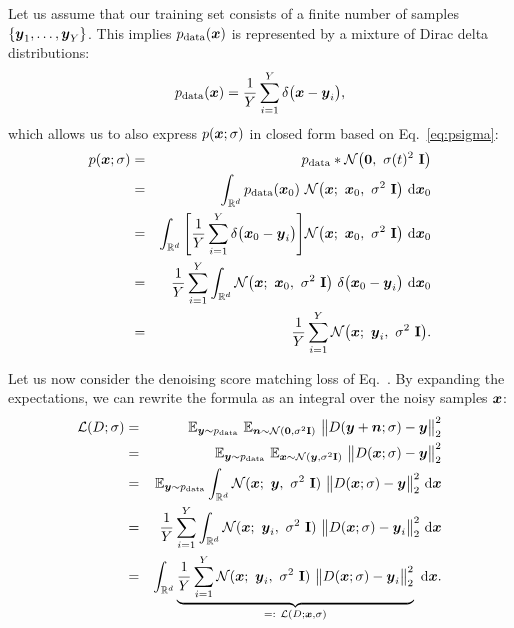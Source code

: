 Let us assume that our training set consists of a finite number of samples $\{\boldsymbol{y}_1, \dots, \boldsymbol{y}_Y\}$.
This implies $p_\text{data}(\boldsymbol{x})$ is represented by a mixture of Dirac delta distributions:
\begin{equation}
  p_\text{data}(\boldsymbol{x}) = \frac{1}{Y} \sum_{i=1}^Y \delta \big( \boldsymbol{x} - \boldsymbol{y}_i \big)
  \text{,}
\end{equation}
which allows us to also express $p(\boldsymbol{x}; \sigma)$ in closed form based on Eq.~\ref{eq:psigma}:
\begin{eqnarray}
  p(\boldsymbol{x}; \sigma) &=& p_\text{data} \ast \mathcal{N} \big( \mathbf{0}, ~\sigma(t)^2 ~\mathbf{I} \big) \\
  &=& \int_{\mathbb{R}^d} p_\text{data}(\boldsymbol{x}_0) ~\mathcal{N} \big( \boldsymbol{x}; ~\boldsymbol{x}_0, ~\sigma^2 ~\mathbf{I} \big) ~\mathrm{d}\boldsymbol{x}_0 \\
  &=& \int_{\mathbb{R}^d} \Bigg[ \frac{1}{Y} \sum_{i=1}^Y \delta \big( \boldsymbol{x}_0 - \boldsymbol{y}_i \big) \Bigg] \mathcal{N} \big( \boldsymbol{x}; ~\boldsymbol{x}_0, ~\sigma^2 ~\mathbf{I} \big) ~\mathrm{d}\boldsymbol{x}_0 \\
  &=& \frac{1}{Y} \sum_{i=1}^Y \int_{\mathbb{R}^d} \mathcal{N} \big( \boldsymbol{x}; ~\boldsymbol{x}_0, ~\sigma^2 ~\mathbf{I} \big) ~\delta \big( \boldsymbol{x}_0 - \boldsymbol{y}_i \big) ~\mathrm{d}\boldsymbol{x}_0 \\
  &=& \frac{1}{Y} \sum_{i=1}^Y \mathcal{N} \big( \boldsymbol{x}; ~\boldsymbol{y}_i, ~\sigma^2 ~\mathbf{I} \big)
  \label{eq:diracpsigma}
  \text{.}
\end{eqnarray}

Let us now consider the denoising score matching loss of Eq.~.
By expanding the expectations, we can rewrite the formula as an integral over the noisy samples $\boldsymbol{x}$:
\begin{eqnarray}
  \mathcal{L}(D; \sigma) &=& \mathbb{E}_{\boldsymbol{y} \sim p_\text{data}} ~\mathbb{E}_{\boldsymbol{n} \sim \mathcal{N}(\mathbf{0}, \sigma^2 \mathbf{I})} ~\big\lVert D(\boldsymbol{y} + \boldsymbol{n}; \sigma) - \boldsymbol{y} \big\rVert^2_2 \\
  &=& \mathbb{E}_{\boldsymbol{y} \sim p_\text{data}} ~\mathbb{E}_{\boldsymbol{x} \sim \mathcal{N}(\boldsymbol{y}, \sigma^2 \mathbf{I})} ~\big\lVert D(\boldsymbol{x}; \sigma) - \boldsymbol{y} \big\rVert^2_2 \\
  &=& \mathbb{E}_{\boldsymbol{y} \sim p_\text{data}} \int_{\mathbb{R}^d} \mathcal{N}(\boldsymbol{x}; ~\boldsymbol{y}, ~\sigma^2 ~\mathbf{I}) ~\big\lVert D(\boldsymbol{x}; \sigma) - \boldsymbol{y} \big\rVert^2_2 ~\mathrm{d}\boldsymbol{x} \\
  &=& \frac{1}{Y} \sum_{i=1}^Y \int_{\mathbb{R}^d} \mathcal{N}(\boldsymbol{x}; ~\boldsymbol{y}_i, ~\sigma^2 ~\mathbf{I}) ~\big\lVert D(\boldsymbol{x}; \sigma) - \boldsymbol{y}_i \big\rVert^2_2 ~\mathrm{d}\boldsymbol{x} \\
  &=& \int_{\mathbb{R}^d} \underbrace{\frac{1}{Y} \sum_{i=1}^Y \mathcal{N}(\boldsymbol{x}; ~\boldsymbol{y}_i, ~\sigma^2 ~\mathbf{I}) ~\big\lVert D(\boldsymbol{x}; \sigma) - \boldsymbol{y}_i \big\rVert^2_2}_{=: ~ \mathcal{L}(D; \boldsymbol{x}, \sigma)}  ~\mathrm{d}\boldsymbol{x}
  \label{eq:slicedloss}
  \text{.}
\end{eqnarray}

